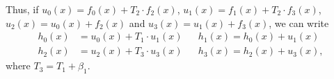 \documentclass[11pt,runningheads]{llncs}
\begin{document}
Thus, if $u_0(x) = f_0(x) + T_2 \cdot f_2(x)$, $u_1(x) = f_1(x) + T_2 \cdot f_3(x)$, $u_2(x) = u_0(x) + f_2(x)$ and $u_3(x) = u_1(x) + f_3(x)$, we can write
\begin{equation*}
    \begin{aligned}
        h_0(x) &= u_0(x) + T_1 \cdot u_1(x) && h_1(x) = h_0(x) + u_1(x)\\
        h_2(x) &= u_2(x) + T_3 \cdot u_3(x) && h_3(x) = h_2(x) + u_3(x),
    \end{aligned}
\end{equation*}
where $T_3 = T_1 + \beta_1$.

\end{document}
